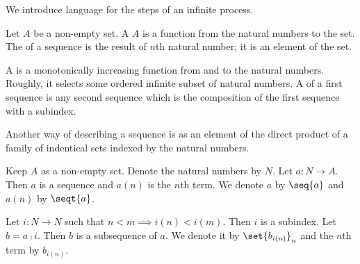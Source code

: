 
\sbasic








\sstart
{}


We introduce language
for the steps of an
infinite process.


Let $A$ be a non-empty
set.
A  $A$
is a function
from the natural numbers to the
set.
The  of a sequence
is the result of $n$th natural
number; it is an element of
the set.

A  is a monotonically
increasing function from and to the
natural numbers.
Roughly,
it
selects some ordered infinite
subset of natural numbers.
A  of a first
sequence is any second sequence
which is the composition of the
first sequence with a subindex.


Another way of describing a sequence
is as an element of the direct product
of a family of indentical sets indexed
by the natural numbers.


Keep $A$ as a non-empty set.
Denote the natural numbers by $N$.
Let $a: N \to A$.
Then $a$ is a sequence and
$a(n)$ is the $n$th term.
We denote $a$ by
$\seq{a}$ and $a(n)$ by $\seqt{a}$.

Let $i: N \to N$ such that
$n < m \implies i(n) < i(m)$.
Then $i$ is a subindex.
Let $b = a \comp i$.
Then $b$ is a subsequence of $a$.
We denote it by
$\set{b_{i(n)}}_n$ and the $n$th
term by $b_{i(n)}$.
\strats
